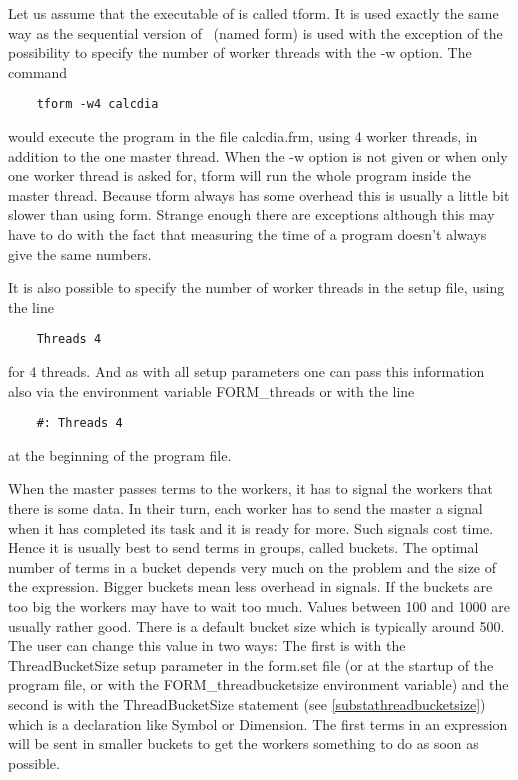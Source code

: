 Let us assume that the executable of \TFORM{} is called tform. It 
is used exactly the same way as the sequential version of \FORM\ (named form) 
is used with the exception of the possibility to specify the number of 
worker threads with the -w option. The command
\begin{verbatim}
    tform -w4 calcdia
\end{verbatim}
would execute the program in the file calcdia.frm, using 4 worker threads, 
in addition to the one master thread. When the -w option is not given or 
when only one worker thread is asked for, tform will run the whole program 
inside the master thread. Because tform always has some 
overhead this is usually a little bit slower than using form. Strange 
enough there are exceptions although this may have to do with the fact that 
measuring the time of a program doesn't always give the same numbers.

It is also possible to specify the number of worker threads in the setup 
file, using the line
\begin{verbatim}
    Threads 4
\end{verbatim}
for 4 threads. And as with all setup parameters one can pass this 
information also via the environment variable FORM\_threads or with the line
\begin{verbatim}
    #: Threads 4
\end{verbatim}
at the beginning of the program file.

When the master passes terms to the workers, it has to signal 
the workers that there is some data. In their turn, each worker has to send 
the master a signal when it has completed its task and it is ready for 
more. Such signals cost time. Hence it is usually best to send terms in 
groups, called buckets. The optimal number of terms in a 
bucket depends very much on the problem and the size of the expression. 
Bigger buckets mean less overhead in signals. If the buckets are too big 
the workers may have to wait too much. Values between 100 and 1000 are 
usually rather good. There is a default bucket size which is typically 
around 500. The user can change this value in two ways: The first is with 
the ThreadBucketSize setup parameter in the 
form.set file (or at the startup of the program file, or with the 
FORM\_threadbucketsize environment variable) and the second is with the 
ThreadBucketSize statement (see \ref{substathreadbucketsize}) which is a 
declaration like Symbol or Dimension. The first terms in an expression will 
be sent in smaller buckets to get the workers something to do as soon as 
possible.

